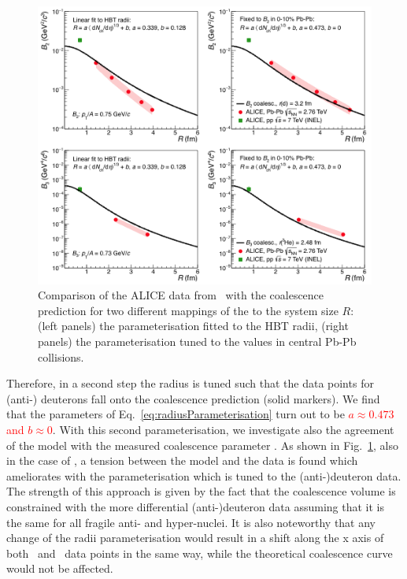 \documentclass[a4paper,11pt]{scrartcl} %
\begin{document}
\begin{figure}[htbp]
	\begin{center}
		\includegraphics[width=\textwidth]{radiiParamCompareData.png}
		\caption{Comparison of the ALICE data from~\cite{ALICE:deuteronppPbPb2015,ALICE:nucleipp2017} with the coalescence prediction for two different mappings of the \avdNdeta to the system size $R$: (left panels) the parameterisation fitted to the HBT radii, (right panels) the parameterisation tuned to the \btwo values in central Pb-Pb collisions.}
		\label{fig:CompareB2B3forDifferentParamWithData}
	\end{center}
\end{figure}


Therefore, in a second step the radius is tuned such that the data points for (anti-) deuterons fall onto the coalescence prediction (solid markers). We find that the parameters of Eq.~\ref{eq:radiusParameterisation} turn out to be \textcolor{red}{$a \approx 0.473$ and $b \approx 0$}. 
With this second parameterisation, we investigate also the agreement of the model with the measured coalescence parameter \bthree. As shown in Fig.~\ref{fig:CompareB2B3forDifferentParamWithData}, also in the case of \bthree, a tension between the model and the data is found which ameliorates with the parameterisation which is tuned to the (anti-)deuteron data. The strength of this approach is given by the fact that the coalescence volume is constrained with the more differential (anti-)deuteron data assuming that it is the same for all fragile anti- and hyper-nuclei. %
It is also noteworthy that any change of the radii parameterisation would result in a shift along the x axis of both \btwo~and \bthree~data points in the same way, while the theoretical coalescence curve would not be affected. 
 
\end{document}
